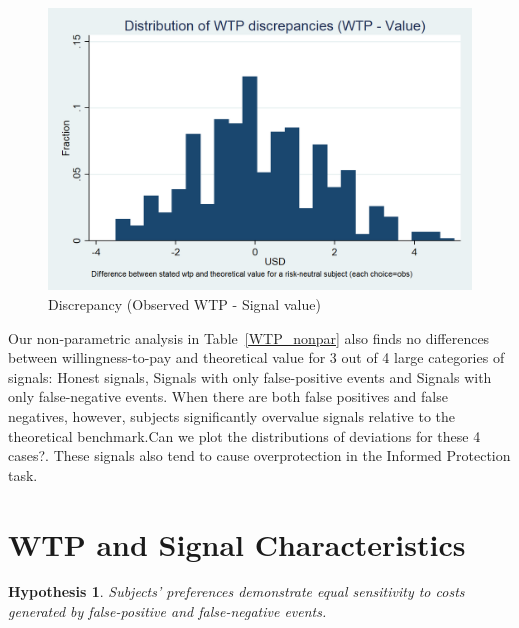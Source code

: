 \documentclass[12pt,a4paper]{article}
\newcommand{\pmt}[1]{{\color{Blue}#1}}
\newtheorem{hypothesis}{Hypothesis}
\begin{document}
\begin{figure}[H]\centering 
	\includegraphics[scale=0.2]{Graphs/hist_WTP_discr1.png}

\caption{Discrepancy (Observed WTP - Signal value)}\label{fig:WTPhist}
\end{figure}

Our non-parametric analysis in Table~\ref{WTP_nonpar} also finds no differences between willingness-to-pay and theoretical value for 3 out of 4 large categories of signals: Honest signals, Signals with only false-positive events and Signals with only false-negative events. When there are both false positives and false negatives, however, subjects significantly overvalue signals relative to the theoretical benchmark.\pmt{Can we plot the distributions of deviations for these 4 cases?}. These signals also tend to cause overprotection in the Informed Protection task.









\vspace{20pt}
\section{WTP and Signal Characteristics}\label{sec:results}

\begin{hypothesis} Subjects' preferences demonstrate equal sensitivity to costs generated by false-positive and false-negative events. \end{hypothesis}
\end{document}

